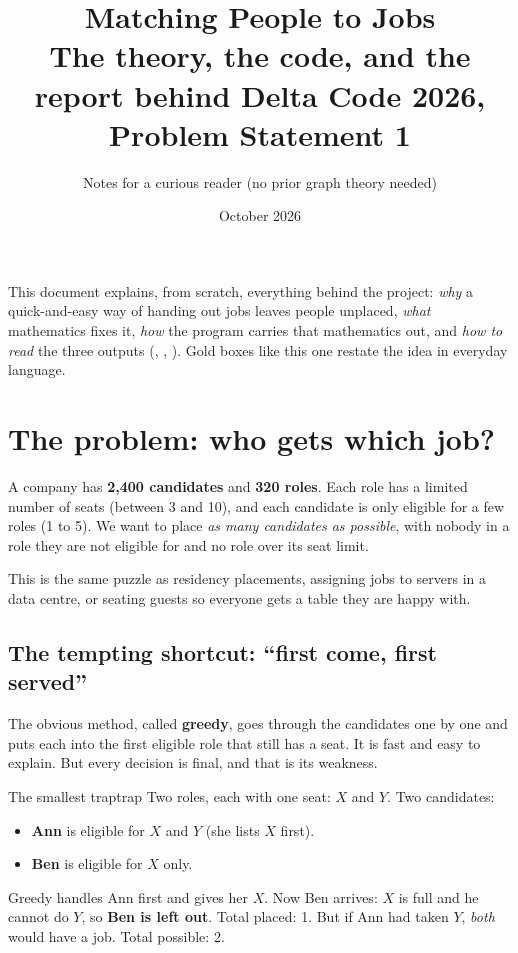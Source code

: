 \documentclass[11pt]{article}
\title{\textbf{Matching People to Jobs}\\[2pt]\large The theory, the code, and the report behind Delta Code 2026, Problem Statement 1}
\author{Notes for a curious reader (no prior graph theory needed)}
\date{October 2026}
\begin{document}
\maketitle
\tableofcontents
\bigskip

\begin{plain}
This document explains, from scratch, everything behind the project: \emph{why} a quick-and-easy way of handing out jobs leaves people unplaced, \emph{what} mathematics fixes it, \emph{how} the program  carries that mathematics out, and \emph{how to read} the three outputs (, , ). Gold boxes like this one restate the idea in everyday language.
\end{plain}

\section{The problem: who gets which job?}\label{sec:problem}

A company has \textbf{2{,}400 candidates} and \textbf{320 roles}. Each role has a limited number of seats (between 3 and 10), and each candidate is only eligible for a few roles (1 to 5). We want to place \emph{as many candidates as possible}, with nobody in a role they are not eligible for and no role over its seat limit.

This is the same puzzle as residency placements, assigning jobs to servers in a data centre, or seating guests so everyone gets a table they are happy with.

\subsection{The tempting shortcut: ``first come, first served''}

The obvious method, called \textbf{greedy}, goes through the candidates one by one and puts each into the first eligible role that still has a seat. It is fast and easy to explain. But every decision is final, and that is its weakness.

\begin{example}{The smallest trap}{trap}
Two roles, each with one seat: $X$ and $Y$. Two candidates:
\begin{itemize}[nosep]
 \item \textbf{Ann} is eligible for $X$ and $Y$ (she lists $X$ first).
 \item \textbf{Ben} is eligible for $X$ only.
\end{itemize}
Greedy handles Ann first and gives her $X$. Now Ben arrives: $X$ is full and he cannot do $Y$, so \textbf{Ben is left out}. Total placed: 1. But if Ann had taken $Y$, \emph{both} would have a job. Total possible: 2.
\end{example}
\end{document}
